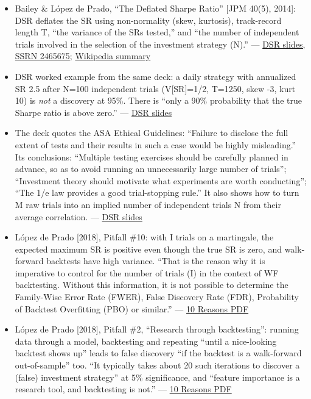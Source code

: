 \documentclass{article}
\begin{document}
\begin{itemize}

\item Bailey \& López de Prado, ``The Deflated Sharpe Ratio'' [JPM 40(5), 2014]: DSR deflates the SR using non-normality (skew, kurtosis), track-record length T, ``the variance of the SRs tested,'' and ``the number of independent trials involved in the selection of the investment strategy (N).'' --- \href{https://pdfs.semanticscholar.org/c215/d0a2064ce1a3565d276475abc84305418f0f.pdf}{DSR slides, SSRN 2465675}; \href{https://en.wikipedia.org/wiki/Deflated_Sharpe_ratio}{Wikipedia summary}

\item DSR worked example from the same deck: a daily strategy with annualized SR 2.5 after N=100 independent trials (V[SR]=1/\allowbreak{}2, T=1250, skew -3, kurt 10) is \emph{not} a discovery at 95\%. There is ``only a 90\% probability that the true Sharpe ratio is above zero.'' --- \href{https://pdfs.semanticscholar.org/c215/d0a2064ce1a3565d276475abc84305418f0f.pdf}{DSR slides}

\item The deck quotes the ASA Ethical Guidelines: ``Failure to disclose the full extent of tests and their results in such a case would be highly misleading.'' Its conclusions: ``Multiple testing exercises should be carefully planned in advance, so as to avoid running an unnecessarily large number of trials''; ``Investment theory should motivate what experiments are worth conducting''; ``The 1/\allowbreak{}e law provides a good trial-stopping rule.'' It also shows how to turn M raw trials into an implied number of independent trials N from their average correlation. --- \href{https://pdfs.semanticscholar.org/c215/d0a2064ce1a3565d276475abc84305418f0f.pdf}{DSR slides}

\item López de Prado [2018], Pitfall \#10: with I trials on a martingale, the expected maximum SR is positive even though the true SR is zero, and walk-forward backtests have high variance. ``That is the reason why it is imperative to control for the number of trials (I) in the context of WF backtesting. Without this information, it is not possible to determine the Family-Wise Error Rate (FWER), False Discovery Rate (FDR), Probability of Backtest Overfitting (PBO) or similar.'' --- \href{https://www.smallake.kr/wp-content/uploads/2018/07/SSRN-id3104816.pdf}{10 Reasons PDF}

\item López de Prado [2018], Pitfall \#2, ``Research through backtesting'': running data through a model, backtesting and repeating ``until a nice-looking backtest shows up'' leads to false discovery ``if the backtest is a walk-forward out-of-sample'' too. ``It typically takes about 20 such iterations to discover a (false) investment strategy'' at 5\% significance, and ``feature importance is a research tool, and backtesting is not.'' --- \href{https://www.smallake.kr/wp-content/uploads/2018/07/SSRN-id3104816.pdf}{10 Reasons PDF}


\end{itemize}
\end{document}
